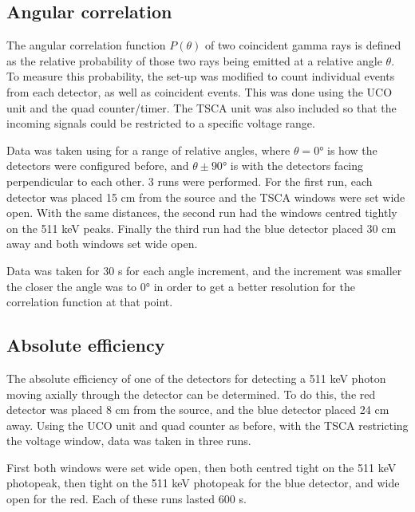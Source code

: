 \documentclass[11pt]{article}
\numberwithin{equation}{section}
\numberwithin{figure}{section}
\numberwithin{table}{section}
\begin{document}
\subsection{Angular correlation}
\par The angular correlation function $P(\theta)$ of two coincident gamma rays is defined as the relative probability of those two rays being emitted at a relative angle $\theta$. To measure this probability, the set-up was modified to count individual events from each detector, as well as coincident events. This was done using the UCO unit and the quad counter/timer. The TSCA unit was also included so that the incoming signals could be restricted to a specific voltage range.
\par Data was taken using  for a range of relative angles, where $\theta=\ang{0}$ is how the detectors were configured before, and $\theta\pm\ang{90}$ is with the detectors facing perpendicular to each other. 3 runs were performed. For the first run, each detector was placed 15 cm from the source and the TSCA windows were set wide open. With the same distances, the second run had the windows centred tightly on the 511 keV peaks. Finally the third run had the blue detector placed 30 cm away and both windows set wide open. 
\par Data was taken for 30 s for each angle increment, and the increment was smaller the closer the angle was to $\ang{0}$ in order to get a better resolution for the correlation function at that point.

\subsection{Absolute efficiency}
\par The absolute efficiency of one of the detectors for detecting a 511 keV photon moving axially through the detector can be determined. To do this, the red detector was placed 8 cm from the  source, and the blue detector placed 24 cm away. Using the UCO unit and quad counter as before, with the TSCA restricting the voltage window, data was taken in three runs.
\par First both windows were set wide open, then both centred tight on the 511 keV photopeak, then tight on the 511 keV photopeak for the blue detector, and wide open for the red. Each of these runs lasted 600 s.
\end{document}
